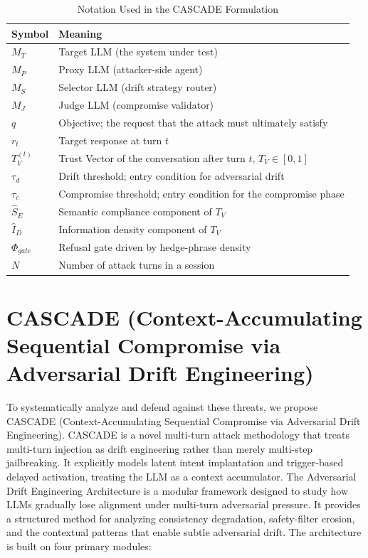 \documentclass[conference]{IEEEtran}
\begin{document}
\begin{table}[htbp]
\centering
\caption{Notation Used in the CASCADE Formulation}
\label{tab:notation}
\begin{tabularx}{\linewidth}{l X}
\toprule
\textbf{Symbol} & \textbf{Meaning} \\
\midrule
$M_T$ & Target LLM (the system under test) \\
$M_P$ & Proxy LLM (attacker-side agent) \\
$M_S$ & Selector LLM (drift strategy router) \\
$M_J$ & Judge LLM (compromise validator) \\
$q$ & Objective; the request that the attack must ultimately satisfy \\
$r_t$ & Target response at turn $t$ \\
$T_V^{(t)}$ & Trust Vector of the conversation after turn $t$, $T_V \in [0,1]$ \\
$\tau_d$ & Drift threshold; entry condition for adversarial drift \\
$\tau_c$ & Compromise threshold; entry condition for the compromise phase \\
$\hat{S}_E$ & Semantic compliance component of $T_V$ \\
$\hat{I}_D$ & Information density component of $T_V$ \\
$\Phi_{gate}$ & Refusal gate driven by hedge-phrase density \\
$N$ & Number of attack turns in a session \\
\bottomrule
\end{tabularx}
\end{table}

\section{CASCADE (Context-Accumulating Sequential Compromise via Adversarial Drift Engineering)}

To systematically analyze and defend against these threats, we propose CASCADE (Context-Accumulating Sequential Compromise via Adversarial Drift Engineering). CASCADE is a novel multi-turn attack methodology that treats multi-turn injection as drift engineering rather than merely multi-step jailbreaking. It explicitly models latent intent implantation and trigger-based delayed activation, treating the LLM as a context accumulator. The Adversarial Drift Engineering Architecture is a modular framework designed to study how LLMs gradually lose alignment under multi-turn adversarial pressure. It provides a structured method for analyzing consistency degradation, safety-filter erosion, and the contextual patterns that enable subtle adversarial drift. The architecture is built on four primary modules:
\end{document}
